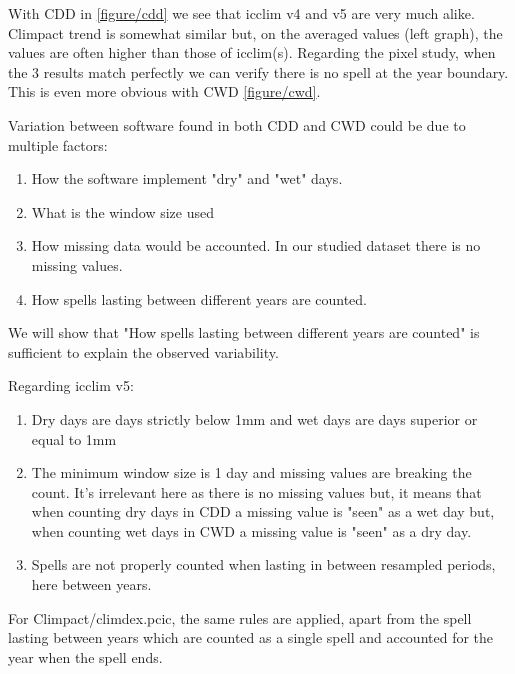 \documentclass[a4paper,11pt]{article}
\begin{document}
            With CDD in \ref{figure/cdd} we see that icclim v4 and v5 are very much alike.
            Climpact trend is somewhat similar but, on the averaged values (left graph), the values are often higher than those of icclim(s).
            Regarding the pixel study, when the 3 results match perfectly we can verify there is no spell at the year boundary.
            This is even more obvious with CWD \ref{figure/cwd}.

            Variation between software found in both CDD and CWD could be due to multiple factors:
            
            \begin{minipage}{\linewidth}
            \begin{enumerate}
                \item How the software implement "dry" and "wet" days.
                \item What is the window size used
                \item How missing data would be accounted. In our studied dataset there is no missing values.
                \item How spells lasting between different years are counted.
            \end{enumerate}
            \end{minipage}

            We will show that "How spells lasting between different years are counted" is sufficient to explain the observed variability.

            Regarding icclim v5:
            \begin{enumerate}
                \item Dry days are days strictly below 1mm and wet days are days superior or equal to 1mm
                \item The minimum window size is 1 day and missing values are breaking the count. 
                    It's irrelevant here as there is no missing values but, it means that when counting dry days in CDD a missing value is "seen" as a wet day but, when counting wet days in CWD a missing value is "seen" as a dry day.
                \item Spells are not properly counted when lasting in between resampled periods, here between years.
            \end{enumerate}
            For Climpact/climdex.pcic, the same rules are applied, apart from the spell lasting between years which are counted as a single spell and accounted for the year when the spell ends.
            
\end{document}
